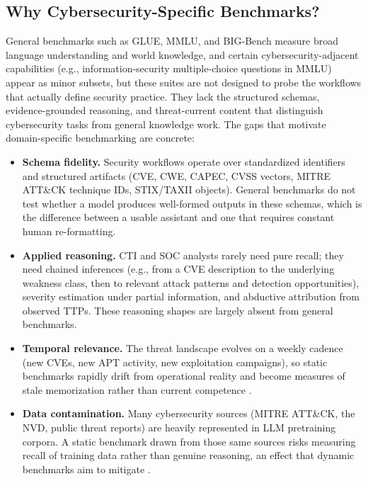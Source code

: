 \documentclass[unnumsec,webpdf,contemporary,large]{oup-authoring-template}
\theoremstyle{thmstyleone}
\theoremstyle{thmstyletwo}
\theoremstyle{thmstylethree}
\begin{document}
\subsection{Why Cybersecurity-Specific Benchmarks?}

General benchmarks such as GLUE, MMLU, and BIG-Bench measure broad language understanding and world knowledge, and certain cybersecurity-adjacent capabilities (e.g., information-security multiple-choice questions in MMLU) appear as minor subsets, but these suites are not designed to probe the workflows that actually define security practice. They lack the structured schemas, evidence-grounded reasoning, and threat-current content that distinguish cybersecurity tasks from general knowledge work. The gaps that motivate domain-specific benchmarking are concrete:

\begin{itemize}
  \item \textbf{Schema fidelity.} Security workflows operate over standardized identifiers and structured artifacts (CVE, CWE, CAPEC, CVSS vectors, MITRE ATT\&CK technique IDs, STIX/TAXII objects). General benchmarks do not test whether a model produces well-formed outputs in these schemas, which is the difference between a usable assistant and one that requires constant human re-formatting.
  \item \textbf{Applied reasoning.} CTI and SOC analysts rarely need pure recall; they need chained inferences (e.g., from a CVE description to the underlying weakness class, then to relevant attack patterns and detection opportunities), severity estimation under partial information, and abductive attribution from observed TTPs. These reasoning shapes are largely absent from general benchmarks.
  \item \textbf{Temporal relevance.} The threat landscape evolves on a weekly cadence (new CVEs, new APT activity, new exploitation campaigns), so static benchmarks rapidly drift from operational reality and become measures of stale memorization rather than current competence \cite{alam2025athenabench}.
  \item \textbf{Data contamination.} Many cybersecurity sources (MITRE ATT\&CK, the NVD, public threat reports) are heavily represented in LLM pretraining corpora. A static benchmark drawn from those same sources risks measuring recall of training data rather than genuine reasoning, an effect that dynamic benchmarks aim to mitigate \cite{alam2025athenabench}.
\end{itemize}
\end{document}
